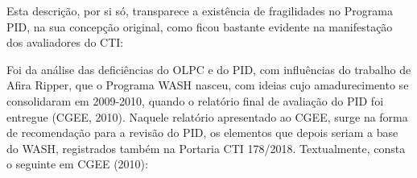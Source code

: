 \documentclass[
12pt,		%
openright,	%
twoside,  %
a4paper,			%
chapter=TITLE,		%
english,			%
french,				%
spanish,			%
brazil				%
]{USPSC-classe/USPSC}
\begin{document}
Esta descri\c{c}\~ao, por si s\'o, transparece a exist\^encia de fragilidades no Programa PID, na sua concep\c{c}\~ao original, como ficou bastante evidente na manifesta\c{c}\~ao dos avaliadores do CTI:


















\noindent\begin{center}\mbox{\centering{}}\end{center}


Foi da an\'alise das defici\^encias do OLPC e do PID, com influ\^encias do trabalho de Afira Ripper, que o Programa WASH nasceu, com ideias cujo amadurecimento se consolidaram em 2009-2010, quando o relat\'orio final de avalia\c{c}\~ao do PID foi entregue  (CGEE, 2010). Naquele relat\'orio apresentado ao CGEE, surge na forma de recomenda\c{c}\~ao para a revis\~ao do PID, os elementos que depois seriam a base do WASH, registrados tamb\'em na Portaria CTI 178/2018. Textualmente, consta o seguinte em  CGEE (2010):
\end{document}
